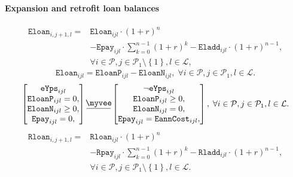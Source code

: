 \documentclass{amsbook}
\newcommand{\myveebar}{\mathbin{\vcenter{\hbox{$ \underline{\mkern-2.4mu{\myvee}\mkern-2.4mu} $}}}}
\begin{document}
\paragraph{Expansion and retrofit loan balances}
%
\begin{equation}\begin{split}
    \mathtt{Eloan}_{i,j+1,l} =& \mathtt{Eloan}_{ijl} \cdot \left(1+r\right)^n \\
    &- \mathtt{Epay}_{ijl} \cdot \sum^{n-1}_{k=0} \left(1+r\right)^k 
    - \mathtt{Eladd}_{ijl} \cdot \left(1+r\right)^{n-1}, \\
    &\forall i \in \mathcal{P} ,
    j \in \mathcal{P}_1 \setminus \left\{1\right\},
    l \in \mathcal{L},
\end{split}\end{equation}
%
\begin{equation}
    \mathtt{Eloan}_{ijl} = \mathtt{EloanP}_{ijl} - \mathtt{EloanN}_{ijl}
    , \; \forall i\in \mathcal{P}, j\in \mathcal{P}_1, l\in \mathcal{L}.
\end{equation}
%
\begin{equation}
    \begin{bmatrix}
        \mathtt{eYps}_{ijl} \\
        \mathtt{EloanP}_{ijl} = 0, \\
        \mathtt{EloanN}_{ijl} \geq 0,\\
        \mathtt{Epay}_{ijl} = 0, \\
    \end{bmatrix}
    \myveebar
    \begin{bmatrix}
        \neg \mathtt{eYps}_{ijl} \\
        \mathtt{EloanP}_{ijl} \geq 0, \\
        \mathtt{EloanN}_{ijl} = 0, \\
        \mathtt{Epay}_{ijl} = \mathtt{EannCost}_{ijl}, \\
    \end{bmatrix}
    , \; \forall i\in \mathcal{P}, j\in \mathcal{P}_1, l\in \mathcal{L}.
\end{equation}
%
\begin{equation}\begin{split}
    \mathtt{Rloan}_{i,j+1,l} =& \mathtt{Rloan}_{ijl} \cdot \left(1+r\right)^n \\
    &- \mathtt{Rpay}_{ijl} \cdot \sum^{n-1}_{k=0} \left(1+r\right)^k 
    - \mathtt{Rladd}_{ijl} \cdot \left(1+r\right)^{n-1}, \\
    &\forall i \in \mathcal{P} ,
    j \in \mathcal{P}_1 \setminus \left\{1\right\},
    l \in \mathcal{L}.
\end{split}\end{equation}
\end{document}
